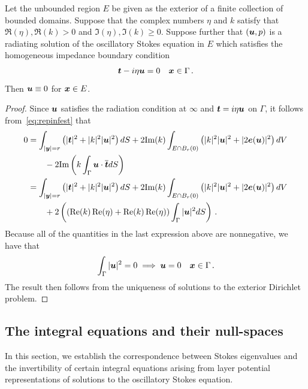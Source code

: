 \begin{thrm}
  Let the unbounded region $E$ be given as the exterior
  of a finite collection of bounded domains.
  Suppose that the complex numbers $\eta$ and $k$ satisfy that
  $\Re(\eta), \Re(k) > 0$ and $\Im(\eta),\Im(k) \geq 0$.
  Suppose further that
  $({\boldsymbol u},p)$ is a radiating solution of the
  oscillatory Stokes equation in $E$ which satisfies
  the homogeneous impedance boundary condition
  \begin{equation}
{\boldsymbol t} - i \eta {\boldsymbol u} = 0 \quad {\boldsymbol x} \in \Gamma \, . \nonumber
\end{equation}
Then ${\boldsymbol u} \equiv 0$ for ${\boldsymbol x} \in E$.
\end{thrm}

\begin{proof}
Since ${\boldsymbol u}$ satisfies the radiation condition at $\infty$ and ${\boldsymbol t} = i\eta {\boldsymbol u}$
on $\Gamma$, it follows from~\cref{eq:repinfest} that
\begin{align*}
0 &=
\int_{|{\boldsymbol y}|=r} \left( |{\boldsymbol t}|^2 + |k|^2 |{\boldsymbol u}|^2 \right) dS +
2 \text{Im}(k) \int_{E \cap B_{r}(0)} \left(|k|^2 |{\boldsymbol u}|^2 + |2{\boldsymbol e}({\boldsymbol u})|^2 \right)
dV \nonumber \\
& \qquad - 2 \text{Im} \left( k \int_{\Gamma} {\boldsymbol u} \cdot \overline{{\boldsymbol t}} dS  \right) \\
&= 
\int_{|{\boldsymbol y}|=r} \left( |{\boldsymbol t}|^2 + |k|^2 |{\boldsymbol u}|^2 \right) dS +
2 \text{Im}(k) \int_{E \cap B_{r}(0)} \left(|k|^2 |{\boldsymbol u}|^2 + |2{\boldsymbol e}({\boldsymbol u})|^2 \right)
dV \nonumber \\
& \qquad + 2 \left( \left (\operatorname{Re}(k)\operatorname{Re}(\eta) + \operatorname{Re}(k)\operatorname{Re}(\eta)
\right ) \int_{\Gamma} |{\boldsymbol u}|^{2} dS  \right)
\, .
\end{align*}
Because all of the quantities in the last expression above are
nonnegative, we have that
\begin{equation}
  \int_{\Gamma} |{\boldsymbol u}|^{2} = 0 \implies {\boldsymbol u} = 0  \quad {\boldsymbol x} \in \Gamma \, .
  \nonumber
\end{equation}
The result then follows from the uniqueness of solutions to the exterior
Dirichlet problem.
\end{proof}

\subsection{The integral equations and their null-spaces}

In this section, we establish the correspondence between
Stokes eigenvalues and the invertibility of certain integral
equations arising from layer potential representations
of solutions to the oscillatory Stokes equation.

